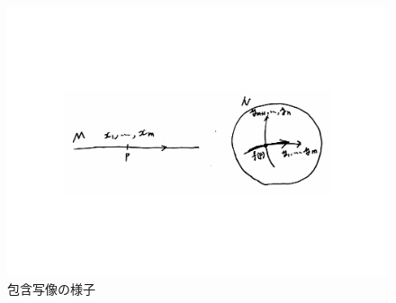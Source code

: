 \documentclass[a4j,12pt]{jarticle}
\theoremstyle{definition}
\begin{document}
\begin{figure}[H]
    \centering
    \includegraphics[keepaspectratio, scale=0.5]{subsetmapTheorem.pdf}
    \caption{包含写像の様子}
    \label{subsetmapTheorem}
   \end{figure}
   
\end{document}
